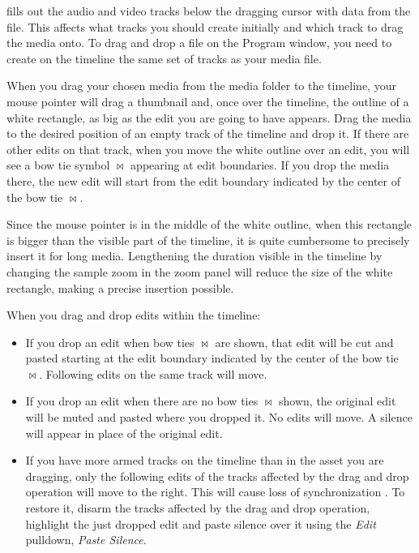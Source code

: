 \CGG{} fills out the audio and video tracks below the dragging
cursor with data from the file. This affects what tracks you should
create initially and which track to drag the media onto. To drag and
drop a file on the Program window, you need to create on the
timeline the same set of tracks as your media file.

When you drag your chosen media from the media folder to the
timeline, your mouse pointer will drag a thumbnail and, once over
the timeline, the outline of a white rectangle, as big as the edit
you are going to have appears.  Drag the media to the desired
position of an empty track of the timeline and drop it.  If there
are other edits on that track, when you move the white outline over
an edit, you will see a bow tie symbol $\bowtie$ appearing at edit
boundaries. If you drop the media there, the new edit will start
from the edit boundary indicated by the center of the bow tie
$\bowtie$.

Since the mouse pointer is in the middle of the white outline, when
this rectangle is bigger than the visible part of the timeline, it
is quite cumbersome to precisely insert it for long
media. Lengthening the duration visible in the timeline by changing
the sample zoom in the zoom panel will reduce the size of the white
rectangle, making a precise insertion possible.

When you drag and drop edits within the timeline:

\begin{itemize}
\item If you drop an edit when bow ties $\bowtie$ are shown,
  that edit will be cut and pasted starting at the edit boundary
  indicated by the center of the bow tie $\bowtie$.  Following edits
  on the same track will move.
\item If you drop an edit when there are no bow ties $\bowtie$
  shown, the original edit will be muted and pasted where you dropped
  it. No edits will move. A silence will appear in place of the
  original edit.
\item If you have more armed tracks on the timeline than in the
  asset you are dragging, only the following edits of the tracks
  affected by the drag and drop operation will move to the right. This
  will cause loss of synchronization . To restore it, disarm the tracks
  affected by the drag and drop operation, highlight the just dropped
  edit and paste silence over it using the \textit{Edit} pulldown,
  \textit{Paste Silence}.
\end{itemize}

